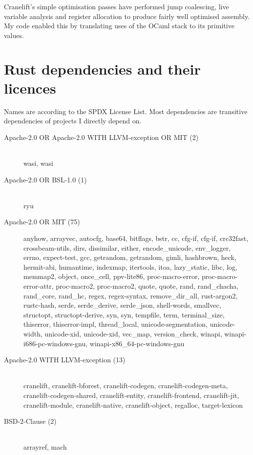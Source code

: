 Cranelift's simple optimisation passes have performed jump coalescing, live variable analysis and
register allocation
to produce fairly well optimised assembly. My code enabled this by translating uses of the OCaml
stack to its primitive values.

\chapter{Rust dependencies and their licences} \label{appendix-licence}

Names are according to the SPDX License List. Most dependencies are transitive dependencies
of projects I directly depend on.

\begin{description}
    \item[Apache-2.0 OR Apache-2.0 WITH LLVM-exception OR MIT (2)] \hfill \\ wasi, wasi
    \item[Apache-2.0 OR BSL-1.0 (1)] \hfill \\ ryu
    \item[Apache-2.0 OR MIT (75)] anyhow, arrayvec, autocfg, base64, bitflags, bstr, cc,
          cfg-if, cfg-if, crc32fast, crossbeam-utils, dirs, dissimilar, either, encode\_unicode,
          env\_logger,
          errno, expect-test, gcc, getrandom, getrandom, gimli, hashbrown, heck, hermit-abi,
          humantime,
          indexmap, itertools, itoa, lazy\_static, libc, log, memmap2, object, once\_cell,
          ppv-lite86,
          proc-macro-error, proc-macro-error-attr, proc-macro2, proc-macro2, quote, quote, rand,
          rand\_chacha, rand\_core, rand\_hc, regex, regex-syntax, remove\_dir\_all, rust-argon2,
          rustc-hash,
          serde, serde\_derive, serde\_json, shell-words, smallvec, structopt, structopt-derive,
          syn, syn,
          tempfile, term, terminal\_size, thiserror, thiserror-impl, thread\_local,
          unicode-segmentation,
          unicode-width, unicode-xid, unicode-xid, vec\_map, version\_check, winapi,
          winapi-i686-pc-windows-gnu, winapi-x86\_64-pc-windows-gnu
    \item[Apache-2.0 WITH LLVM-exception (13)] \hfill \\ cranelift, cranelift-bforest,
          cranelift-codegen,
          cranelift-codegen-meta, cranelift-codegen-shared, cranelift-entity, cranelift-frontend,
          cranelift-jit, cranelift-module, cranelift-native, cranelift-object, regalloc,
          target-lexicon
    \item[BSD-2-Clause (2)] \hfill \\ arrayref, mach

\end{description}
